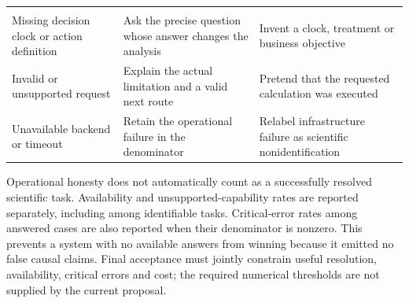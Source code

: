 \begin{longtable}[]{@{}lll@{}}
\begin{minipage}[t]{0.30\columnwidth}
\end{minipage}\tabularnewline
\begin{minipage}[t]{0.30\columnwidth}\raggedright
Missing decision clock or action definition\strut
\end{minipage} & \begin{minipage}[t]{0.30\columnwidth}\raggedright
Ask the precise question whose answer changes the analysis\strut
\end{minipage} & \begin{minipage}[t]{0.30\columnwidth}\raggedright
Invent a clock, treatment or business objective\strut
\end{minipage}\tabularnewline
\begin{minipage}[t]{0.30\columnwidth}\raggedright
Invalid or unsupported request\strut
\end{minipage} & \begin{minipage}[t]{0.30\columnwidth}\raggedright
Explain the actual limitation and a valid next route\strut
\end{minipage} & \begin{minipage}[t]{0.30\columnwidth}\raggedright
Pretend that the requested calculation was executed\strut
\end{minipage}\tabularnewline
\begin{minipage}[t]{0.30\columnwidth}\raggedright
Unavailable backend or timeout\strut
\end{minipage} & \begin{minipage}[t]{0.30\columnwidth}\raggedright
Retain the operational failure in the denominator\strut
\end{minipage} & \begin{minipage}[t]{0.30\columnwidth}\raggedright
Relabel infrastructure failure as scientific nonidentification\strut
\end{minipage}\tabularnewline
\bottomrule
\end{longtable}

Operational honesty does not automatically count as a successfully
resolved scientific task. Availability and unsupported-capability rates
are reported separately, including among identifiable tasks.
Critical-error rates among answered cases are also reported when their
denominator is nonzero. This prevents a system with no available answers
from winning because it emitted no false causal claims. Final acceptance
must jointly constrain useful resolution, availability, critical errors
and cost; the required numerical thresholds are not supplied by the
current proposal.

